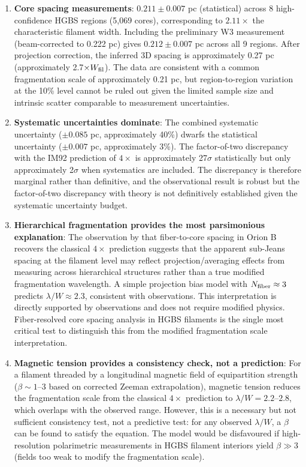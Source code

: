\documentclass[11pt,a4paper]{article}
\begin{document}
\begin{enumerate}
    \item \textbf{Core spacing measurements}: $0.211 \pm 0.007$ pc (statistical) across 8 high-confidence HGBS regions (5,069 cores), corresponding to $2.11\times$ the characteristic filament width. Including the preliminary W3 measurement (beam-corrected to 0.222 pc) gives $0.212 \pm 0.007$ pc across all 9 regions. After projection correction, the inferred 3D spacing is approximately 0.27 pc (approximately 2.7$\times W_{\rm fil}$). The data are consistent with a common fragmentation scale of approximately 0.21 pc, but region-to-region variation at the 10\% level cannot be ruled out given the limited sample size and intrinsic scatter comparable to measurement uncertainties.

    \item \textbf{Systematic uncertainties dominate}: The combined systematic uncertainty ($\pm0.085$ pc, approximately 40\%) dwarfs the statistical uncertainty ($\pm0.007$ pc, approximately 3\%). The factor-of-two discrepancy with the IM92 prediction of $4\times$ is approximately 27$\sigma$ statistically but only approximately 2$\sigma$ when systematics are included. The discrepancy is therefore marginal rather than definitive, and the observational result is robust but the factor-of-two discrepancy with theory is not definitively established given the systematic uncertainty budget.

    \item \textbf{Hierarchical fragmentation provides the most parsimonious explanation}: The observation by \citet{Yang2024} that fiber-to-core spacing in Orion B recovers the classical $4\times$ prediction suggests that the apparent sub-Jeans spacing at the filament level may reflect projection/averaging effects from measuring across hierarchical structures rather than a true modified fragmentation wavelength. A simple projection bias model with $N_{\rm fiber} \approx 3$ predicts $\lambda/W \approx 2.3$, consistent with observations. This interpretation is directly supported by observations and does not require modified physics. Fiber-resolved core spacing analysis in HGBS filaments is the single most critical test to distinguish this from the modified fragmentation scale interpretation.

    \item \textbf{Magnetic tension provides a consistency check, not a prediction}: For a filament threaded by a longitudinal magnetic field of equipartition strength ($\beta \sim 1$--$3$ based on corrected Zeeman extrapolation), magnetic tension reduces the fragmentation scale from the classical $4\times$ prediction to $\lambda/W = 2.2$--$2.8$, which overlaps with the observed range. However, this is a necessary but not sufficient consistency test, not a predictive test: for any observed $\lambda/W$, a $\beta$ can be found to satisfy the equation. The model would be disfavoured if high-resolution polarimetric measurements in HGBS filament interiors yield $\beta \gg 3$ (fields too weak to modify the fragmentation scale).


\end{enumerate}
\end{document}
